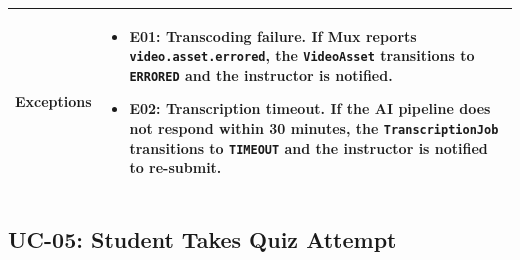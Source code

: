 \begin{longtable}{p{3cm}p{10cm}}
  \textbf{Exceptions} &
  \begin{itemize}
    \item \textbf{E01: Transcoding failure.} If Mux reports \texttt{video.asset.errored}, the \texttt{VideoAsset} transitions to \texttt{ERRORED} and the instructor is notified.
    \item \textbf{E02: Transcription timeout.} If the AI pipeline does not respond within 30 minutes, the \texttt{TranscriptionJob} transitions to \texttt{TIMEOUT} and the instructor is notified to re-submit.
  \end{itemize} \\
  \bottomrule
\end{longtable}

\subsection{UC-05: Student Takes Quiz Attempt}

